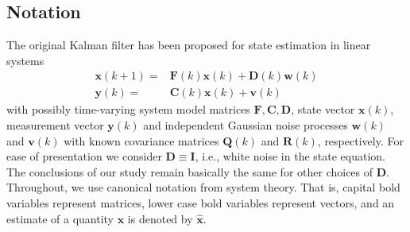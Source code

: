 \documentclass[10pt]{article}
\begin{document}
\begin{spacing}{1}
\section{Notation}
\label{sec:Notation}
The original Kalman filter \cite{Kalman} has been proposed for state estimation in linear systems
\begin{align}
\bm{x}(k+1) =& \bm{F}(k)\bm{x}(k) + \bm{D}(k)\bm{w}(k) \label{linear_state}\\
\bm{y}(k) =& \bm{C}(k)\bm{x}(k) + \bm{v}(k) \label{linear_obs}
\end{align}
with possibly time-varying system model matrices $\bm{F, C, D}$, state vector $\bm{x}(k)$, measurement vector $\bm{y}(k)$ and independent Gaussian noise processes $\bm{w}(k)$ and $\bm{v}(k)$ with known covariance matrices $\bm{Q}(k)$ and $\bm{R}(k)$, respectively. For ease of presentation we consider $\bm{D}\equiv \bm{I}$, i.e., white noise in the state equation. The conclusions of our study remain basically the same for other choices of $\bm{D}$. Throughout, we use canonical notation from system theory. That is, capital bold variables represent matrices, lower case bold variables represent vectors, and an estimate of a quantity $\bm{x}$ is denoted by $\hat{\bm{x}}$.


\end{spacing}
\end{document}
